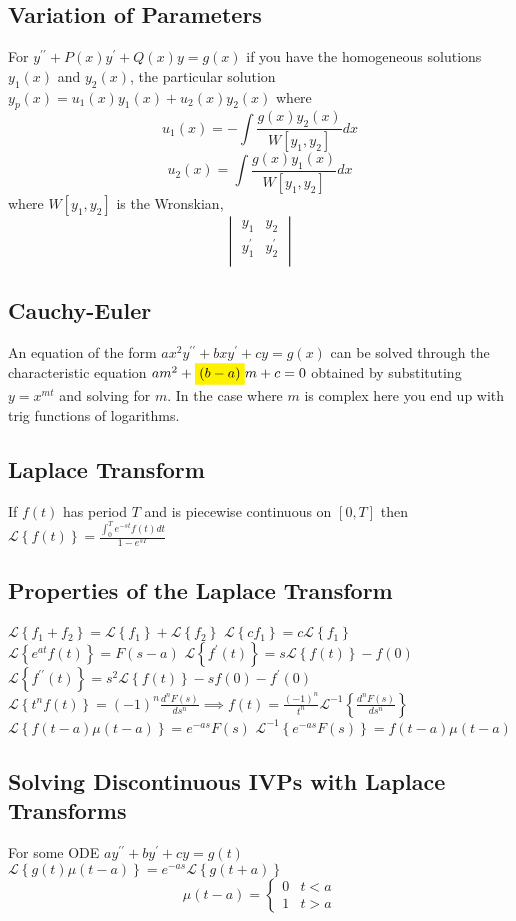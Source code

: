 \documentclass[10pt,landscape,letterpaper]{cheatsheet}
\newcommand{\laplace}[1]{\mathcal{L}\left\{#1\right\}}
\newcommand{\laplacei}[1]{\mathcal{L}^{-1}\left\{#1\right\}}
\newcommand{\highlight}[1]{\colorbox{yellow}{$\displaystyle #1$}}
\begin{document}
\subsection*{Variation of Parameters}
For $y^{\prime\prime}+P(x)y^{\prime}+Q(x)y=g(x)$ if you have the homogeneous solutions $y_1(x)$ and $y_2(x)$, the particular solution $y_p(x)=u_1(x)y_1(x)+u_2(x)y_2(x)$ where
$$u_1(x)=-\int\frac{g(x)y_2(x)}{W\left[y_1, y_2\right]}dx$$
$$u_2(x)=\int\frac{g(x)y_1(x)}{W\left[y_1, y_2\right]}dx$$
where $W\left[y_1, y_2\right]$ is the Wronskian, 
$$\begin{vmatrix}
                y_1          & y_2          \\ 
                y_1^{\prime} & y_2^{\prime} \\
        \end{vmatrix}$$
\subsection*{Cauchy-Euler}
An equation of the form $ax^2y^{\prime\prime}+bxy^{\prime}+cy=g(x)$ can be solved through the characteristic equation $am^2+\highlight{(b-a)}m+c=0$ obtained by substituting $y=x^{mt}$ and solving for $m$. 
In the case where $m$ is complex here you end up with trig functions of logarithms.
\subsection*{Laplace Transform}
If $f(t)$ has period $T$ and is piecewise continuous on $[0,T]$ then $\laplace{f(t)}=\frac{\int_{0}^{T}e^{-st}f(t)dt}{1-e^{sT}}$
\subsection*{Properties of the Laplace Transform}
$\laplace{f_1+f_2}=\laplace{f_1}+\laplace{f_2}$
$\laplace{cf_1}=c\laplace{f_1}$
$\laplace{e^{at}f(t)}=F(s-a)$
$\laplace{f^\prime(t)}=s\laplace{f(t)}-f(0)$
$\laplace{f^{\prime\prime}(t)}=s^2\laplace{f(t)}-sf(0)-f^\prime(0)$
$\laplace{t^nf(t)}=(-1)^n\frac{d^nF(s)}{ds^n}\implies f(t)=\frac{\left(-1\right)^{n}}{t^n}\laplacei{\frac{d^nF(s)}{ds^n}}$
$\laplace{f(t-a)\mu(t-a)}=e^{-as}F(s)$
$\laplacei{e^{-as}F(s)}=f(t-a)\mu(t-a)$
\subsection*{Solving Discontinuous IVPs with Laplace Transforms}
For some ODE $ay^{\prime\prime}+by^{\prime}+cy=g(t)$ $\laplace{g(t)\mu(t-a)}=e^{-as}\laplace{g(t+a)}$
$$\mu(t-a)=
        \begin{cases} 
                0 & t<a  \\
                1 & t>a
        \end{cases}
$$
\end{document}
